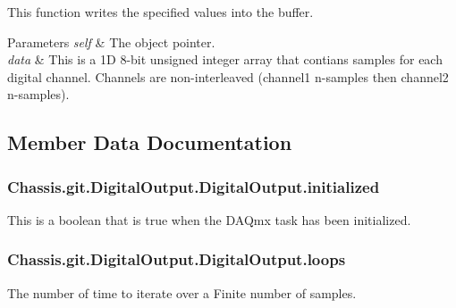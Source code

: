 This function writes the specified values into the buffer. 


\begin{DoxyParams}{Parameters}
{\em self} & The object pointer. \\
\hline
{\em data} & This is a 1\-D 8-\/bit unsigned integer array that contians samples for each digital channel. Channels are non-\/interleaved (channel1 n-\/samples then channel2 n-\/samples). \\
\hline
\end{DoxyParams}


\subsection{Member Data Documentation}
\hypertarget{class_chassis_8git_1_1_digital_output_1_1_digital_output_a04c8f6bec665c117376e77f330f95e46}{
\subsubsection[{initialized}]{\setlength{\rightskip}{0pt plus 5cm}Chassis.\-git.\-Digital\-Output.\-Digital\-Output.\-initialized}}\label{class_chassis_8git_1_1_digital_output_1_1_digital_output_a04c8f6bec665c117376e77f330f95e46}


This is a boolean that is true when the D\-A\-Qmx task has been initialized. 

\hypertarget{class_chassis_8git_1_1_digital_output_1_1_digital_output_a63c305430aa7ad4e132bd9e32f3ae443}{
\subsubsection[{loops}]{\setlength{\rightskip}{0pt plus 5cm}Chassis.\-git.\-Digital\-Output.\-Digital\-Output.\-loops}}\label{class_chassis_8git_1_1_digital_output_1_1_digital_output_a63c305430aa7ad4e132bd9e32f3ae443}


The number of time to iterate over a Finite number of samples. 

